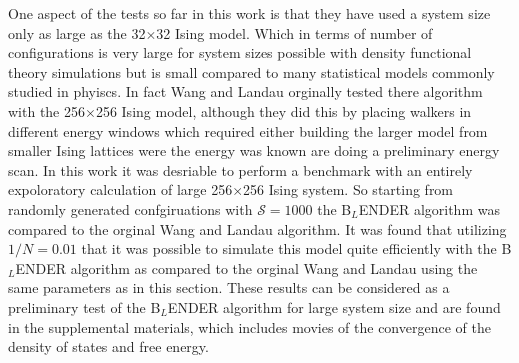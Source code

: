 \documentclass[aps,pre,reprint,superscriptaddress,showkeys]{revtex4-1}
\begin{document}
  One aspect of the tests so far in this work is that they have used a system size only as large as the 32$\times$32 Ising model.  Which in terms of number of configurations is very large for system sizes possible with density functional theory simulations but is small compared to many statistical models commonly studied in phyiscs.  In fact Wang and Landau orginally tested there algorithm with the 256$\times$256 Ising model, although they did this by placing walkers in different energy windows which required either building the larger model from smaller Ising lattices were the energy was known are doing a preliminary energy scan.  In this work it was desriable to perform a benchmark with an entirely expoloratory calculation of large 256$\times$256 Ising system. So starting from randomly generated confgiruations with $\mathcal{S}=1000$ the B$_L$ENDER algorithm was compared to the orginal Wang and Landau algorithm. It was found that utilizing $1/N=0.01$ that it was possible to simulate this model quite efficiently with the B$_L$ENDER algorithm as compared to the orginal Wang and Landau using the same parameters as in this section. These results can be considered as a preliminary test of the B$_L$ENDER algorithm for large system size and are found in the supplemental materials, which includes movies of the convergence of the density of states and free energy. 
\end{document}
